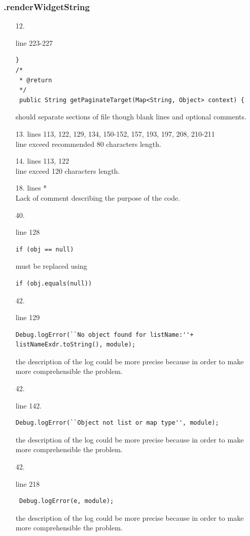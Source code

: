 \documentclass[english]{article}
\begin{document}
\subsubsection*{.renderWidgetString}
\begin{itemize}
    
    	\item[12.]{ line 223-227
		\begin{lstlisting}
}
/*
 * @return
 */
 public String getPaginateTarget(Map<String, Object> context) {
		\end{lstlisting} should separate sections of file though blank lines and optional comments.}
		
\item[13.]{lines 113, 122, 129, 134, 150-152, 157, 193, 197, 208, 210-211 \\
		line exceed recommended 80 characters length.}

\item[14.]{lines  113, 122\\
		line exceed 120 characters length.}
		
		\item[18.]{lines  *\\
		Lack of comment describing the purpose of the code.}

	\item[40.]{ line 128
		\begin{lstlisting}
if (obj == null)
		\end{lstlisting} must be replaced using
		\begin{lstlisting}
if (obj.equals(null))
		\end{lstlisting}}
	\item[42.]{line 129
		\begin{lstlisting}
Debug.logError(``No object found for listName:''+ listNameExdr.toString(), module);
		\end{lstlisting}
		the description of the log could be more precise because in order to make more comprehensible the problem.}
	\item[42.]{line 142.		\begin{lstlisting} 
Debug.logError(``Object not list or map type'', module);
		\end{lstlisting}
		the description of the log could be more precise because in order to make more comprehensible the problem.}
	\item[42.]{line 218
		\begin{lstlisting} 
 Debug.logError(e, module);
		\end{lstlisting}
		the description of the log could be more precise because in order to make more comprehensible the problem.}
	
\end{itemize}
\end{document}
